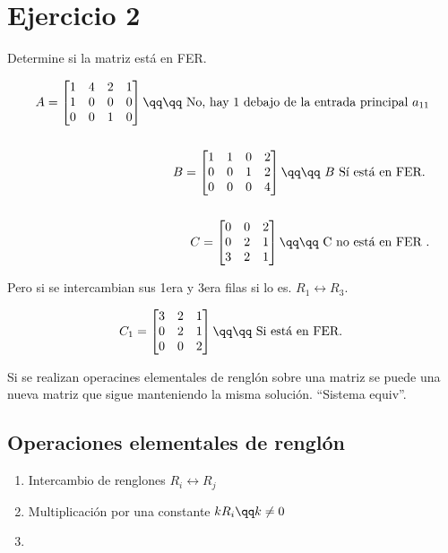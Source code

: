 \section{Ejercicio 2}Determine si la matriz está en FER. 
\begin{center}
   \begin{align*}
       A = \begin{bmatrix}
           1&4&2&1 \\ 
           1&0&0&0 \\ 
           0&0&1&0 \\ 
       \end{bmatrix} \qq \qq \text{ No, hay 1 debajo de la entrada principal $a_{11}$} \\ 
       \\ 
       B = \begin{bmatrix}
           1&1&0&2 \\ 
           0&0&1&2 \\ 
           0&0&0&4 \\ 
       \end{bmatrix} \qq \qq \text{ $B$ Sí está en FER. } \\ 
       \\ 
       C = \begin{bmatrix}
           0&0&2 \\ 
           0&2&1 \\ 
           3&2&1 \\ 
       \end{bmatrix} \qq \qq \text{ C no está en FER }. \\ 
   \end{align*}
\end{center}
Pero si se intercambian sus 1era y 3era filas si lo es. $R_1 \longleftrightarrow R_3$.
\begin{center}
   \begin{align*}
       C_1 = \begin{bmatrix}
           3&2&1 \\ 
           0&2&1 \\ 
           0&0&2 \\ 
       \end{bmatrix} \qq \qq \text{ Si está en FER. } \\ 
   \end{align*}
\end{center}
Si se realizan operacines elementales de renglón sobre una matriz se puede una nueva matriz que sigue manteniendo la misma solución. ``Sistema equiv''.
\subsection{Operaciones elementales de renglón}
\begin{enumerate}
    \item Intercambio de renglones $R_i \longleftrightarrow R_j$ 
    \item Multiplicación por una constante $kR_i \qq k\neq 0$ 
    \item 
\end{enumerate}
